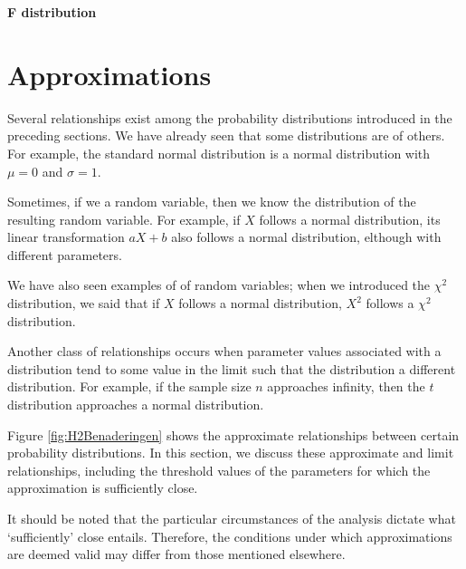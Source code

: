 \begin{exercise}
\label{ex:fdist_p}

\textbf{F distribution}




\end{exercise}

\section{Approximations} %
\label{sec:approximations}

Several relationships exist among the probability distributions introduced in the preceding sections. We have already seen that some distributions are  of others. For example, the standard normal distribution is a normal distribution with $\mu = 0$ and $\sigma = 1$.

Sometimes, if we  a random variable, then we know the distribution of the resulting random variable. For example, if $X$ follows a normal distribution, its linear transformation $aX + b$ also follows a normal distribution, elthough with different parameters.

We have also seen examples of  of random variables; when we introduced the $\chi^2$ distribution, we said that if $X$ follows a normal distribution, $X^2$ follows a $\chi^2$ distribution. 

\bigskip
Another class of relationships occurs when parameter values associated with a distribution tend to some value in the limit such that the distribution  a different distribution. For example, if the sample size $n$ approaches infinity, then the $t$ distribution approaches a normal distribution.

Figure \ref{fig:H2Benaderingen} shows the approximate relationships between certain probability distributions. In this section, we discuss these approximate and limit relationships, including the threshold values of the parameters for which the approximation is sufficiently close.

It should be noted that the particular circumstances of the analysis dictate what `sufficiently' close entails. Therefore, the conditions under which approximations are deemed valid may differ from those mentioned elsewhere.


